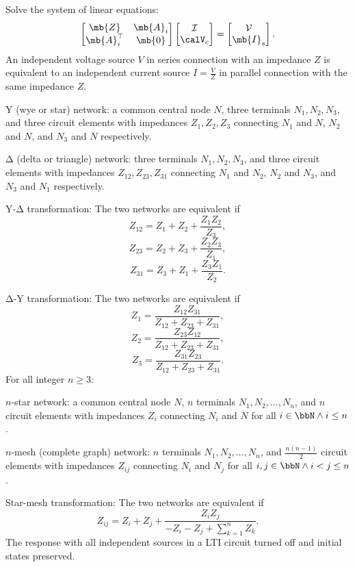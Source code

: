 \documentclass[a4paper,12pt]{article}
\begin{document}
\item Solve the system of linear equations:
\[\begin{bmatrix}\mb{Z}&\mb{A}_i\\\mb{A}_i^{\top}&\mb{0}\end{bmatrix}\begin{bmatrix}\mathcal{I}\\\calV_c\end{bmatrix}=\begin{bmatrix}\mathcal{V}\\\mb{I}_s\end{bmatrix}.\]
\een
\een
{}
An independent voltage source $V$ in series connection with an impedance $Z$ is equivalent to an independent current source $I=\frac{V}{Z}$ in parallel connection with the same impedance $Z$.
\bit
\item Y (wye or star) network: a common central node $N$, three terminals $N_1,N_2,N_3$, and three circuit elements with impedances $Z_1,Z_2,Z_3$ connecting $N_1$ and $N$, $N_2$ and $N$, and $N_3$ and $N$ respectively.
\item Δ (delta or triangle) network: three terminals $N_1,N_2,N_3$, and three circuit elements with impedances $Z_{12},Z_{23},Z_{31}$ connecting $N_1$ and $N_2$, $N_2$ and $N_3$, and $N_3$ and $N_1$ respectively.
\item Y-Δ transformation: The two networks are equivalent if
\[Z_{12}=Z_1+Z_2+\frac{Z_1Z_2}{Z_3},\]
\[Z_{23}=Z_2+Z_3+\frac{Z_2Z_3}{Z_1},\]
\[Z_{31}=Z_3+Z_1+\frac{Z_3Z_1}{Z_2}.\]
\item Δ-Y transformation: The two networks are equivalent if
\[Z_1=\frac{Z_{12}Z_{31}}{Z_{12}+Z_{23}+Z_{31}},\]
\[Z_2=\frac{Z_{23}Z_{12}}{Z_{12}+Z_{23}+Z_{31}},\]
\[Z_3=\frac{Z_{31}Z_{23}}{Z_{12}+Z_{23}+Z_{31}}.\]
\eit
{}
For all integer $n\geq 3$:
\bit
\item $n$-star network: a common central node $N$, $n$ terminals $N_1,N_2,\ldots,N_n$, and $n$ circuit elements with impedances $Z_i$ connecting $N_i$ and $N$ for all $i\in\bbN\land i\leq n$.
\item $n$-mesh (complete graph) network: $n$ terminals $N_1,N_2,\ldots,N_n$, and $\frac{n(n-1)}{2}$ circuit elements  with impedances $Z_{ij}$ connecting $N_i$ and $N_j$ for all $i,j\in\bbN\land i<j\leq n$.
\item Star-mesh transformation: The two networks are equivalent if
\[Z_{ij}=Z_i+Z_j+\frac{Z_iZ_j}{-Z_i-Z_j+\sum_{k=1}^nZ_k}.\]
\eit
{}
The response with all independent sources in a LTI circuit turned off and initial states preserved.
\end{document}
